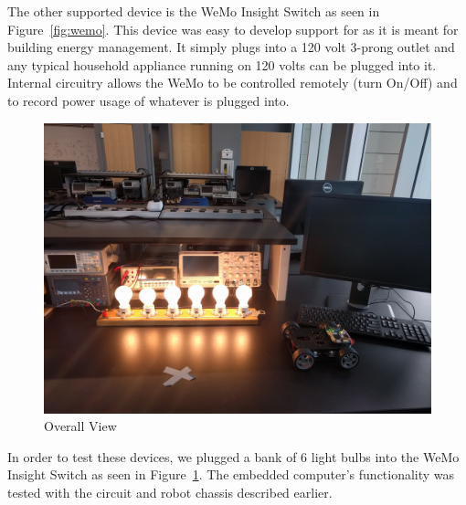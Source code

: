 The other supported device is the WeMo Insight Switch as seen in Figure~\ref{fig:wemo}. This device was easy to develop support for as it is meant for building energy management. It simply plugs into a 120 volt 3-prong outlet and any typical household appliance running on 120 volts can be plugged into it. Internal circuitry allows the WeMo to be controlled remotely (turn On/Off) and to record power usage of whatever is plugged into.

\begin{figure}[H]
    \centering
    \includegraphics[scale=0.1]{figs/overallView.jpg}
    \caption{Overall View}
    \label{fig:overallView}
\end{figure}

In order to test these devices, we plugged a bank of 6 light bulbs into the WeMo Insight Switch as seen in Figure~\ref{fig:overallView}. The embedded computer's functionality was tested with the circuit and robot chassis described earlier.
